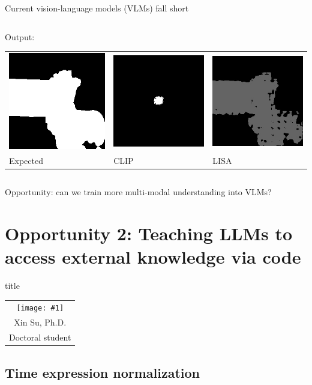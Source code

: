 \documentclass[14pt,aspectratio=169]{beamer}
\newcommand{\headshot}[3]{{\tiny\setlength{\tabcolsep}{0pt}%
\begin{tabular}{c}
\texttt{[image: \#1]} \\
#2 \\
#3
\end{tabular}}}
\newcommand{\sectionbox}{%
\centering
\begin{beamercolorbox}[sep=8pt,center,shadow=true,rounded=true]{title}
  \usebeamerfont{title}\insertsectionhead\par%
\end{beamercolorbox}
\vspace{.2\textheight}}
\begin{document}
\begin{frame}{Current vision-language models (VLMs) fall short}
\begin{columns}
\begin{column}{0.48\textwidth}
\medskip
Output: \\
\begin{tabular}{ l l l @{}}
\includegraphics[width=.25\textwidth]{compgeo/GL024_425_color_output_reference.png}
&
\includegraphics[width=.25\textwidth]{compgeo/GL024_425_color_output_clip.png}
&
\includegraphics[width=.25\textwidth]{compgeo/GL024_425_color_output_lisa.jpg}
\\
Expected & CLIP & LISA
\end{tabular}
\end{column}
\end{columns}
\pause
\bigskip
\alert{Opportunity: can we train more multi-modal understanding into VLMs?}
\end{frame}

\section{Opportunity 2: Teaching LLMs to access external knowledge via code}

\begin{frame}[b]
\sectionbox
\hfill
\headshot{people/su-xin.jpg}{Xin Su, Ph.D.}{Doctoral student}
\end{frame}

\subsection{Time expression normalization}
\end{document}
